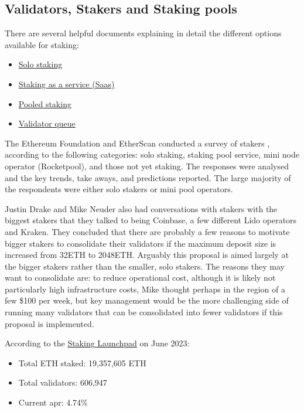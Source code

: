 \documentclass[UTF8]{article}
\begin{document}
{%
\subsection{Validators, Stakers and Staking pools}
\label{sec:stakers}
There are several helpful documents explaining in detail the different options available for staking:
\begin{itemize}
\item \href{https://ethereum.org/en/staking/solo/}{Solo staking} \cite{efsolo}
\item \href{https://ethereum.org/en/staking/saas/}{Staking as a service (Saas)} \cite{efsaas}
\item \href{https://ethereum.org/en/staking/pools/}{Pooled staking} \cite{efpools}
\item \href{https://www.validatorqueue.com/}{Validator queue} \cite{ea2023q}
\end{itemize}

The Ethereum Foundation and EtherScan conducted a survey of stakers \cite{Smith2023}, according to the following categories: solo staking, staking pool service, mini node operator (Rocketpool), and those not yet staking. The responses were analysed and the key trends, take aways, and predictions reported. The large majority of the respondents were either solo stakers or mini pool operators.

Justin Drake and Mike Neuder also had conversations with stakers with the biggest stakers that they talked to being Coinbase, a few different Lido operators and Kraken. They concluded that there are probably a few reasons to motivate bigger stakers to consolidate their validators if the maximum deposit size is increased from 32ETH to 2048ETH. Arguably this proposal is aimed largely at the bigger stakers rather than the smaller, solo stakers. The reasons they may want to consolidate are: to reduce operational cost, although it is likely not particularly high infrastructure costs, Mike thought perhaps in the region of a few \$100 per week, but key management would be the more challenging side of running many validators that can be consolidated into fewer validators if this proposal is implemented. 

According to the \href{https://launchpad.ethereum.org/en/}{Staking Launchpad} on June 2023:
\begin{itemize}
\item Total ETH staked: 19,357,605 ETH
\item Total validators: 606,947
\item Current \gls{apr}: 4.74\%
\end{itemize}

}
\end{document}
